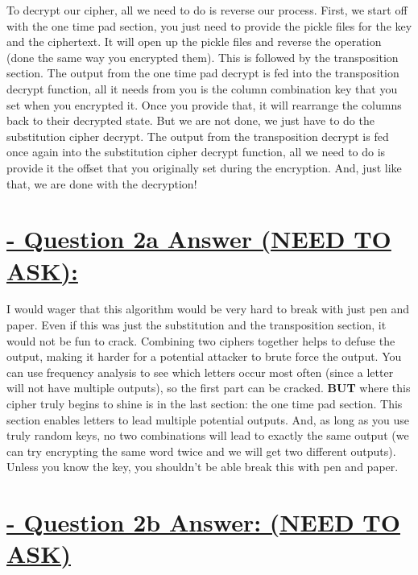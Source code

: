 \documentclass{article}
\begin{document}
\newline
To decrypt our cipher, all we need to do is reverse our process. First, we start off with the one time pad section, you just need to provide the pickle files for the key and the ciphertext. It will open up the pickle files and reverse the operation (done the same way you encrypted them). This is followed by the transposition section. The output from the one time pad decrypt is fed into the transposition decrypt function, all it needs from you is the column combination key that you set when you encrypted it. Once you provide that, it will rearrange the columns back to their decrypted state. But we are not done, we just have to do the substitution cipher decrypt. The output from the transposition decrypt is fed once again into the substitution cipher decrypt function, all we need to do is provide it the offset that you originally set during the encryption. And, just like that, we are done with the decryption!
\section{\underline{ - Question 2a Answer (NEED TO ASK):}}
I would wager that this algorithm would be very hard to break with just pen and paper. Even if this was just the substitution and the transposition section, it would not be fun to crack. Combining two ciphers together helps to defuse the output, making it harder for a potential attacker to brute force the output. You can use frequency analysis to see which letters occur most often (since a letter will not have multiple outputs), so the first part can be cracked. \newline
\textbf{BUT} where this cipher truly begins to shine is in the last section: the one time pad section. This section enables letters to lead multiple potential outputs. And, as long as you use truly random keys, no two combinations will lead to exactly the same output (we can try encrypting the same word twice and we will get two different outputs). Unless you know the key, you shouldn't be able break this with pen and paper. 

\section{\underline{ - Question 2b Answer: (NEED TO ASK)}}
\end{document}
